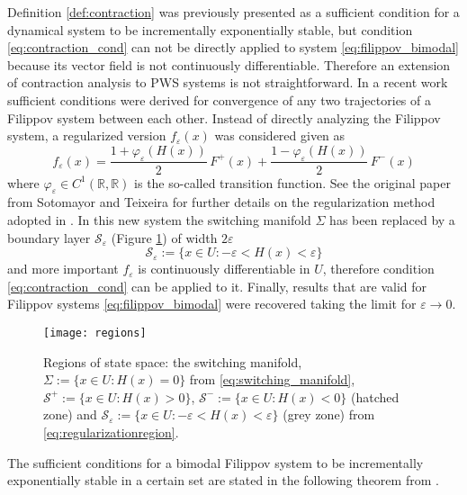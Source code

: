 \documentclass[letterpaper, 10 pt, conference]{ieeeconf}
\begin{document}
Definition \ref{def:contraction} was previously presented as a sufficient condition for a dynamical system to be incrementally exponentially stable, but  condition \eqref{eq:contraction_cond} can not be directly applied to system \eqref{eq:filippov_bimodal} because its vector field is not continuously differentiable. Therefore an extension of contraction analysis to PWS systems is not straightforward. In a recent work \cite{fiore2015contraction} sufficient conditions were derived for convergence of any two trajectories of a Filippov system between each other. Instead of directly analyzing the Filippov system, a regularized version $f_\varepsilon(x)$ was considered given as
\begin{equation*}
\label{eq:regularized_sys}
f_\varepsilon(x)=\frac{1+\varphi_\varepsilon \left( H(x) \right)}{2}\, F^+(x) +
\frac{1-\varphi_\varepsilon \left( H(x) \right)}{2}\, F^-(x)
\end{equation*}
where $\varphi_\varepsilon\in C^1(\mathbb{R},\mathbb{R})$ is the so-called transition function. See the original paper \cite{sotomayor1996regularization} from Sotomayor and Teixeira for further details on the regularization method adopted in \cite{fiore2015contraction}. 
In this new system the switching manifold $\Sigma$ has been replaced by a boundary layer $\mathcal{S}_\varepsilon$ (Figure \ref{fig:regions}) of width $2\varepsilon$
\begin{equation}
\label{eq:regularizationregion}
\mathcal{S}_{\varepsilon}:=\{x\in U : -\varepsilon <H(x)<\varepsilon \}
\end{equation}
and more important $f_\varepsilon$ is continuously differentiable in $U$, therefore condition \eqref{eq:contraction_cond} can be applied to it. Finally, results that are valid for Filippov systems \eqref{eq:filippov_bimodal} were recovered taking the limit for $\varepsilon\rightarrow 0$.
\begin{figure}[t]
\centering 
{\texttt{[image: regions]}}
\caption{Regions of state space: the switching manifold, $\Sigma:=\{x\in U : H(x)=0\}$ from \eqref{eq:switching_manifold}, 
$\mathcal{S}^+:=\{x\in U : H(x)>0\}$, $\mathcal{S}^-:=\{x\in U : H(x)<0\}$ (hatched zone) and $\mathcal{S}_{\varepsilon}:=\{x\in U : -\varepsilon <H(x)<\varepsilon \}$ (grey zone) from \eqref{eq:regularizationregion}.} 
\label{fig:regions}
\end{figure}

The sufficient conditions for a bimodal Filippov system to be incrementally exponentially stable in a certain set are stated in the following theorem from \cite{fiore2015contraction}. 
\end{document}
